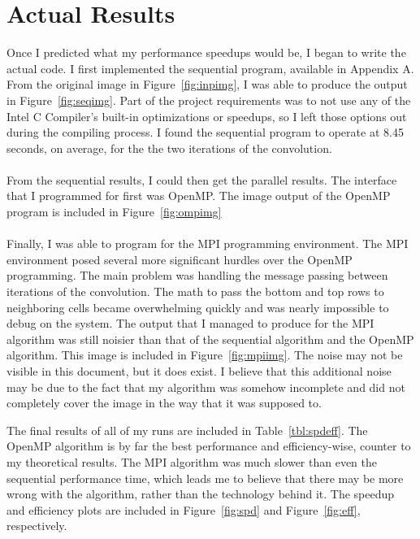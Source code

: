 \documentclass{article}
\begin{document}
\section*{Actual Results}
\begin{par}
Once I predicted what my performance speedups would be, I began to write the actual code.  I first implemented the sequential program, available in Appendix A.  From the original image in Figure~\ref{fig:inpimg}, I was able to produce the output in Figure~\ref{fig:seqimg}.  Part of the project requirements was to not use any of the Intel C Compiler's built-in optimizations or speedups, so I left those options out during the compiling process.  I found the sequential program to operate at 8.45 seconds, on average, for the the two iterations of the convolution. \\
\\
From the sequential results, I could then get the parallel results.  The interface that I programmed for first was OpenMP.  The image output of the OpenMP program is included in Figure~\ref{fig:ompimg}\\
\\
Finally, I was able to program for the MPI programming environment.  The MPI environment posed several more significant hurdles over the OpenMP programming.  The main problem was handling the message passing between iterations of the convolution. The math to pass the bottom and top rows to neighboring cells became overwhelming quickly and was nearly impossible to debug on the system.  The output that I managed to produce for the MPI algorithm was still noisier than that of the sequential algorithm and the OpenMP algorithm.  This image is included in Figure~\ref{fig:mpiimg}.  The noise may not be visible in this document, but it does exist.  I believe that this additional noise may be due to the fact that my algorithm was somehow incomplete and did not completely cover the image in the way that it was supposed to.
\end{par}

\begin{par}
The final results of all of my runs are included in Table~\ref{tbl:spdeff}.  The OpenMP algorithm is by far the best performance and efficiency-wise, counter to my theoretical results.  The MPI algorithm was much slower than even the sequential performance time, which leads me to believe that there may be more wrong with the algorithm, rather than the technology behind it.  The speedup and efficiency plots are included in Figure~\ref{fig:spd} and Figure~\ref{fig:eff}, respectively.
\end{par}
\end{document}
